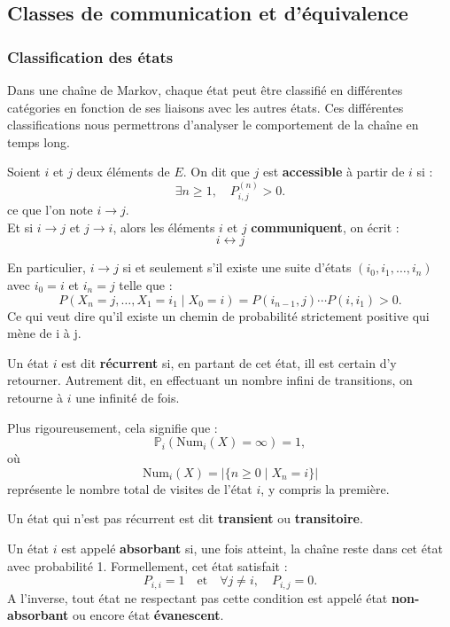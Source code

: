 \documentclass{article}
\begin{document}
\subsection{Classes de communication et d'équivalence}

\subsubsection{Classification des états}
\label{subsubsec: Les différents types d'états}

Dans une chaîne de Markov, chaque état peut être classifié en différentes catégories en fonction de ses liaisons avec les autres états. Ces différentes classifications nous permettrons d'analyser le comportement de la chaîne en temps long.

\begin{tcolorbox}[colback=white,colframe=blue!80!black,title=Accessibilité]
Soient $i$ et $j$ deux éléments de $E$. On dit que $j$ est \textbf{accessible} à partir de $i$ si :
\[
\exists n \geq 1, \quad P_{i,j}^{(n)} > 0.
\]
ce que l'on note $i \to j$. \\
Et si $i \to j$ et $j \to i$, alors les éléments $i$ et $j$ \textbf{communiquent}, on écrit :
\[
i \leftrightarrow j
\]
\end{tcolorbox}

En particulier, $i \to j$ si et seulement s'il existe une suite d'états $(i_0, i_1, \dots, i_n)$ avec $i_0 = i$ et $i_n = j$ telle que :
\[
P(X_n = j, \dots, X_1 = i_1 \mid X_0 = i) = P(i_{n-1}, j) \cdots P(i, i_1) > 0.
\]
Ce qui veut dire qu'il existe un chemin de probabilité strictement positive
qui mène de i à j.

\begin{tcolorbox}[colback=white,colframe=blue!80!black,title=État récurrent]
Un état $i$ est dit \textbf{récurrent} si, en partant de cet état, ill est certain d'y retourner.  
Autrement dit, en effectuant un nombre infini de transitions, on retourne à $i$ une infinité de fois.  

Plus rigoureusement, cela signifie que :  
\[
\mathbb{P}_i(\text{Num}_i(X) = \infty) = 1,
\]
où  
\[
\text{Num}_i(X) = |\{n \geq 0 \mid X_n = i\}|
\]
représente le nombre total de visites de l'état $i$, y compris la première.  

Un état qui n'est pas récurrent est dit \textbf{transient} ou \textbf{transitoire}.  
\end{tcolorbox}

\begin{tcolorbox}[colback=white,colframe=blue!80!black,title=État absorbant]
Un état $i$ est appelé \textbf{absorbant} si, une fois atteint, la chaîne reste dans cet état avec probabilité 1. Formellement, cet état satisfait :
\[
P_{i,i} = 1 \quad \text{et} \quad \forall j \neq i, \quad P_{i,j} = 0.
\]
A l'inverse, tout état ne respectant pas cette condition est appelé état \textbf{non-absorbant} ou encore état \textbf{évanescent}. \\
\end{tcolorbox}
\end{document}
